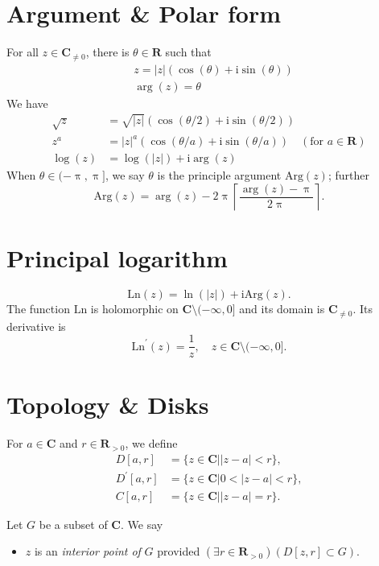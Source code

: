 \documentclass[letterpaper,landscape,9pt,fleqn]{extarticle}
\newcommand{\reals}{\mathbf{R}}
\newcommand{\complex}{\mathbf{C}}
\newcommand{\im}{\mathrm{i}}
\newcommand{\Arg}{\mathrm{Arg}}
\newcommand{\Ln}{\mathrm{Ln}}
\begin{document}
\begin{multicols*}{3}
\section*{Argument \& Polar form}
For all \(z \in \complex_{\neq 0}\), there is 
\(\theta \in \reals\) such that
\begin{alignat*}{1}
   &z = |z| (\cos(\theta) + \im \sin(\theta)) \\
   &\arg(z) = \theta
\end{alignat*}
We have
\begin{alignat*}{1}
  \sqrt{z} &= \sqrt{|z|} (\cos(\theta/2) + \im \sin(\theta/2)) \\
  z^a &= |z|^a  (\cos(\theta/a) + \im \sin(\theta/a))  \quad (\mbox{for } a \in \reals) \\
  \log(z) &= \log(|z|) + \im \arg(z)
\end{alignat*}
When \(\theta \in (-\uppi, \uppi]\), we say $\theta$ is the 
principle argument \(\Arg(z) \); further
\begin{equation*}
  \Arg(z) = \arg(z) - 2 \uppi \left \lceil 
     \frac{\arg(z) - \uppi}{2 \uppi} \right \rceil.
\end{equation*}

\section*{Principal logarithm}
\begin{equation*}
\Ln(z) = \ln(|z|) + \im \Arg(z).
\end{equation*}
The function $\Ln$ is holomorphic on $\complex \setminus (-\infty,0]$
and its domain is $\complex_{\neq 0}$. Its derivative is
\begin{equation*}
  \Ln^\prime(z) = \frac{1}{z}, \quad z \in \complex \setminus (-\infty,0].
\end{equation*}

 
\section*{Topology \& Disks}
For $a \in \complex$ and $r \in \reals_{>0}$, we define
\begin{align*}
  D[a,r] &= \{z \in \complex | |z-a| < r \}, \\
  D^\prime[a,r] &= \{z \in \complex | 0 < |z-a| < r \}, \\
  C[a,r] &= \{z \in \complex | |z-a| = r \}.
\end{align*}

Let $G$ be a subset of $\complex$. We say 
\begin{itemize}
  \item $z$ is an \emph{interior point of} $G$ provided
  \((\exists r \in \reals_{>0})(D[z,r] \subset G) \).


\end{itemize}
\end{multicols*}
\end{document}
